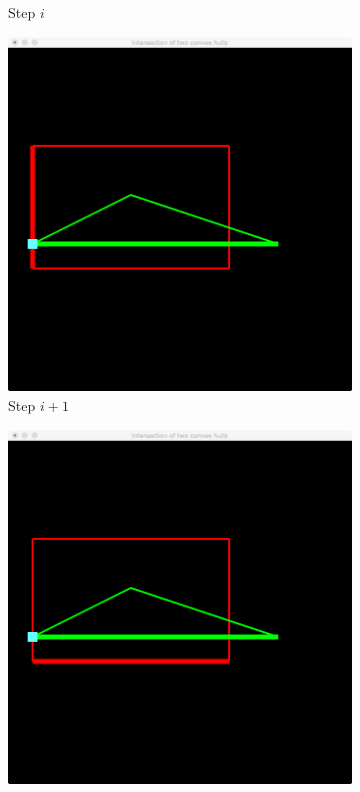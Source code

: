 \begin{figure}
\begin{subfigure}{0.24\textwidth}
				\caption{Step $i$}
				\label{subfig:b:vertexOnEdge:step1}			
			\end{subfigure}
			\begin{subfigure}{0.24\textwidth}
				\includegraphics[width=\textwidth]{./img/b_step_2_deg_one}
				\caption{Step $i + 1$}
				\label{subfig:b:vertexOnEdge:step2}			
			\end{subfigure}		
			\begin{subfigure}{0.24\textwidth}
				\includegraphics[width=\textwidth]{./img/b_step_3_deg_one}

\end{subfigure}
\end{figure}
